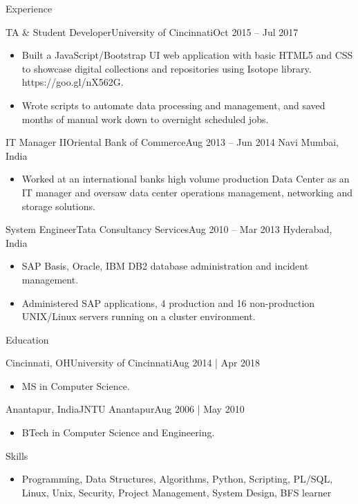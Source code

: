 \documentclass[]{mcdowellcv}
\begin{document}
\begin{cvsection}{Experience}
\begin{cvsubsection}{TA \& Student Developer}{University of Cincinnati}{Oct 2015 -- Jul 2017}
\begin{itemize}
			\item Built a JavaScript/Bootstrap UI web application with basic HTML5 and CSS to showcase digital collections and repositories using Isotope library. https://goo.gl/nX562G.
			\item Wrote scripts to automate data processing and management, and saved months of manual work down to overnight scheduled jobs.
		\end{itemize}
	\end{cvsubsection}
	\begin{cvsubsection}{IT Manager II}{Oriental Bank of Commerce}{Aug 2013 -- Jun 2014}
		Navi Mumbai, India
		\begin{itemize}%
			\item Worked at an international bank\textquotesingle{}s high volume production Data Center as an IT manager and oversaw data center operations management, networking and storage solutions.
		\end{itemize}
	\end{cvsubsection}
	\begin{cvsubsection}{System Engineer}{Tata Consultancy Services}{Aug 2010 -- Mar 2013}
		Hyderabad, India
		\begin{itemize}%
			\item SAP Basis, Oracle, IBM DB2 database administration and incident management.
			\item Administered SAP applications, 4 production and 16 non-production UNIX/Linux servers running on a cluster environment.
		\end{itemize}
	\end{cvsubsection}
\end{cvsection}
\begin{cvsection}{Education}
	\begin{cvsubsection}{Cincinnati, OH}{University of Cincinnati}{Aug 2014 | Apr 2018}
		\begin{itemize}
			\item MS in Computer Science.
		\end{itemize}
	\end{cvsubsection}
	\begin{cvsubsection}{Anantapur, India}{JNTU Anantapur}{Aug 2006 | May 2010}
		\begin{itemize}
			\item BTech in Computer Science and Engineering.
		\end{itemize}
	\end{cvsubsection}
\end{cvsection}
\begin{cvsection}{Skills}
	\begin{cvsubsection}{}{}{}
		\begin{itemize}
			\item  Programming, Data Structures, Algorithms, Python, Scripting, PL/SQL, Linux, Unix, Security, Project Management, System Design, BFS learner
		\end{itemize}
	\end{cvsubsection}
\end{cvsection}
\end{document}
